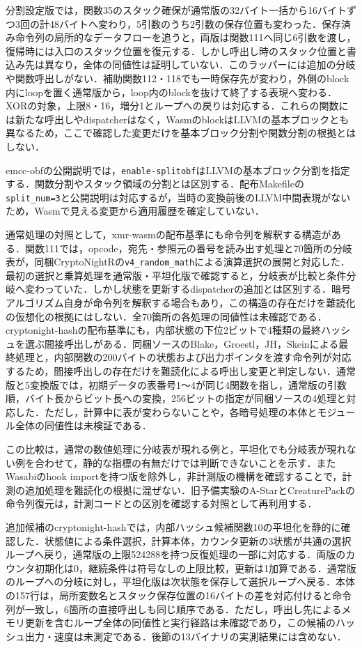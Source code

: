 \documentclass[submit,techrep]{ipsj}
\begin{document}
分割設定版では，関数35のスタック確保が通常版の32バイト一括から16バイトずつ3回の計48バイトへ変わり，5引数のうち2引数の保存位置も変わった．保存済み命令列の局所的なデータフローを追うと，両版は関数111へ同じ6引数を渡し，復帰時には入口のスタック位置を復元する．しかし呼出し時のスタック位置と書込み先は異なり，全体の同値性は証明していない．このラッパーには追加の分岐や関数呼出しがない．補助関数112・118でも一時保存先が変わり，外側のblock内にloopを置く通常版から，loop内のblockを抜けて終了する表現へ変わる．XORの対象，上限8・16，増分1とループへの戻りは対応する．これらの関数には新たな呼出しやdispatcherはなく，WasmのblockはLLVMの基本ブロックとも異なるため，ここで確認した変更だけを基本ブロック分割や関数分割の根拠とはしない．

emcc-obfの公開説明では，\texttt{enable-splitobf}はLLVMの基本ブロック分割を指定する\cite{emccobfdocs}．関数分割やスタック領域の分割とは区別する．配布Makefileの\texttt{split\_num=3}と公開説明は対応するが，当時の変換前後のLLVM中間表現がないため，Wasmで見える変更から適用履歴を確定していない．

通常処理の対照として，xmr-wasmの配布基準にも命令列を解釈する構造がある．関数111では，opcode，宛先・参照元の番号を読み出す処理と70箇所の分岐表が，同梱CryptoNightRの\texttt{v4\_random\_math}による演算選択の展開と対応した．最初の選択と乗算処理を通常版・平坦化版で確認すると，分岐表が比較と条件分岐へ変わっていた．しかし状態を更新するdispatcherの追加とは区別する．暗号アルゴリズム自身が命令列を解釈する場合もあり，この構造の存在だけを難読化の仮想化の根拠にはしない．全70箇所の各処理の同値性は未確認である．cryptonight-hashの配布基準にも，内部状態の下位2ビットで4種類の最終ハッシュを選ぶ間接呼出しがある．同梱ソースのBlake，Groestl，JH，Skeinによる最終処理と，内部関数の200バイトの状態および出力ポインタを渡す命令列が対応するため，間接呼出しの存在だけを難読化による呼出し変更と判定しない．通常版と5変換版では，初期データの表番号1～4が同じ4関数を指し，通常版の引数順，バイト長からビット長への変換，256ビットの指定が同梱ソースの4処理と対応した．ただし，計算中に表が変わらないことや，各暗号処理の本体とモジュール全体の同値性は未検証である．

この比較は，通常の数値処理に分岐表が現れる例と，平坦化でも分岐表が現れない例を合わせて，静的な指標の有無だけでは判断できないことを示す．またWasabiのhook importを持つ版を除外し，非計測版の機構を確認することで，計測の追加処理を難読化の根拠に混ぜない．旧予備実験のA-StarとCreaturePackの命令列復元は，計測コードとの区別を確認する対照として再利用する．

追加候補のcryptonight-hashでは，内部ハッシュ候補関数10の平坦化を静的に確認した．状態値による条件選択，計算本体，カウンタ更新の3状態が共通の選択ループへ戻り，通常版の上限524288を持つ反復処理の一部に対応する．両版のカウンタ初期化は0，継続条件は符号なしの上限比較，更新は1加算である．通常版のループへの分岐に対し，平坦化版は次状態を保存して選択ループへ戻る．本体の157行は，局所変数名とスタック保存位置の16バイトの差を対応付けると命令列が一致し，6箇所の直接呼出しも同じ順序である．ただし，呼出し先によるメモリ更新を含むループ全体の同値性と実行経路は未確認であり，この候補のハッシュ出力・速度は未測定である．後節の13バイナリの実測結果には含めない．
\end{document}
